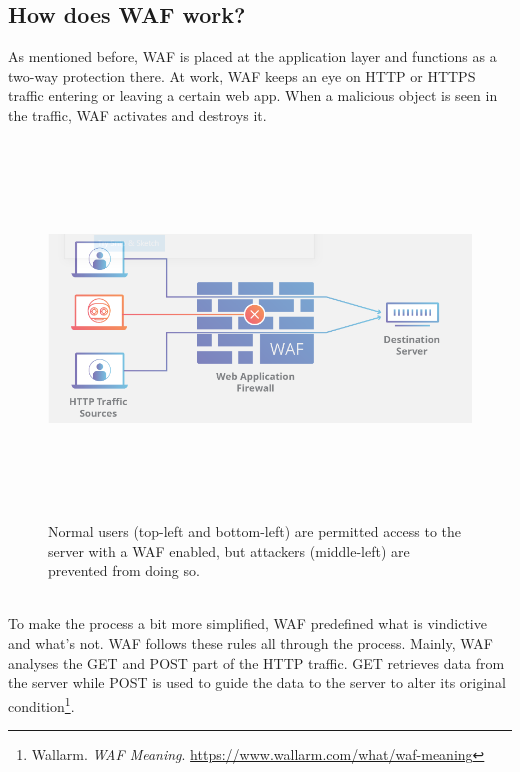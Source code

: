 \subsection{How does WAF work?}
\label{subsec:waf_work}
As mentioned before, WAF is placed at the application layer and functions as a two-way protection there. At work, WAF keeps an eye on HTTP or HTTPS traffic entering or leaving a certain web app. When a malicious object is seen in the traffic, WAF activates and destroys it. \\
\begin{figure}[!h]
   
	\centering
	\includegraphics[width=\linewidth, height=10cm,keepaspectratio]{figures/WAF.JPG}
	\caption{Normal users (top-left and bottom-left) are permitted access to the server with a WAF enabled, but attackers (middle-left) are prevented from doing so.}\label{Fig:Data1}
  
\end{figure}
\\
To make the process a bit more simplified, WAF predefined what is vindictive and what’s not. WAF follows these rules all through the process. Mainly, WAF analyses the GET and POST part of the HTTP traffic. GET retrieves data from the server while POST is used to guide the data to the server to alter its original condition\footnote{Wallarm. \textit{WAF Meaning}. \url{https://www.wallarm.com/what/waf-meaning}}.

